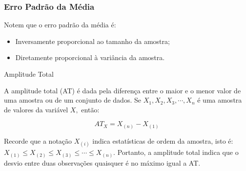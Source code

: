 \documentclass[14pt,aspectratio=1610]{beamer}
\begin{document}
\begin{frame}{}
\frametitle{Erro Padrão da Média}
    \begin{block}{}
    Notem que o erro padrão da média é:
\begin{itemize}
    \item Inversamente proporcional ao tamanho da amostra;
    \item Diretamente proporcional à variância da amostra.
\end{itemize}
    \end{block}
\end{frame}

\begin{frame}{Amplitude Total}
\begin{block}{}
\justifying
A amplitude total (AT) é dada pela diferença entre o maior e o menor valor de uma amostra ou de um conjunto de dados. Se $X_1, X_2, X_3, \cdots , X_n$ é uma amostra de valores da variável $X,$ então:

$$AT_X = X_{(n)} - X_{(1)}$$

Recorde que a notação $X_{(i)}$ indica estatísticas de ordem da amostra, isto é: $X_{(1)} \leq X_{(2)} \leq X_{(3)} \leq \cdots \leq X_{(n)}.$ Portanto, a amplitude total indica que o desvio entre duas observações quaisquer é no máximo igual a AT.
\end{block}
\end{frame}
\end{document}
